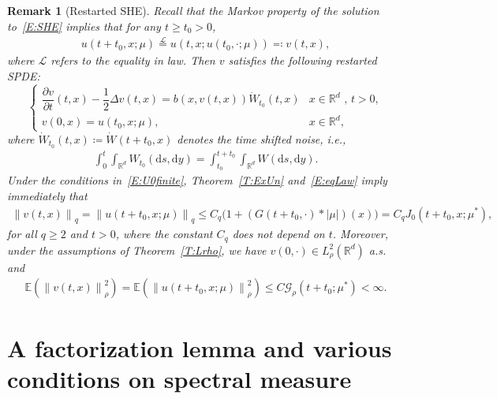 \documentclass[sn-mathphys]{sn-jnl}%
\newcommand{\BR}{\mathbb{R}}
\newcommand{\E}{\mathbb{E}}
\newcommand{\Norm}[1]{\left\| #1 \right\|}
\newcommand{\ud}{\ensuremath{\mathrm{d}}}
\numberwithin{equation}{section}
\theoremstyle{thmstyleone}%
\theoremstyle{thmstyletwo}%
\newtheorem{remark}{Remark}[section]%
\theoremstyle{thmstylethree}%
\begin{document}
\begin{remark}[Restarted SHE]\label{R:Restat}
  Recall that the Markov property of the solution to~\eqref{E:SHE} implies that for any $t\ge
  t_0>0$,
  \begin{align}\label{E:eqLaw}
    u(t + t_0,x;\mu) \stackrel{\mathcal{L}}{=}
    u\left(t,x;u\left(t_0,\cdot;\mu\right)\right) \eqqcolon v(t,x),
  \end{align}
  where $\mathcal{L}$ refers to the equality in law. Then $v$ satisfies the following restarted
  SPDE:
  \begin{equation}\label{E:restart}
    \begin{cases}
      \dfrac{\partial v}{\partial t}(t,x)-\dfrac{1}{2}\Delta v(t,x) = b(x,v(t,x))\dot W_{t_0}(t,x) & \text{$x\in \BR^d$ , $t>0$}, \\
      v(0,x) = u(t_0,x;\mu),                                                                       & x\in\BR^d,
    \end{cases}
  \end{equation}
  where $\dot{W}_{t_0}(t,x) \coloneqq \dot{W}(t + t_0,x)$ denotes the time shifted noise, i.e.,
  \begin{align}\label{E:ShiftW}
    \int_0^t \int_{\BR^d} W_{t_0}(\ud s, \ud y) = \int_{t_0}^{t+t_0} \int_{\BR^d} W(\ud s, \ud y).
  \end{align}
  Under the conditions in~\eqref{E:U0finite}, Theorem~\ref{T:ExUn} and~\eqref{E:eqLaw} imply
  immediately that
  \begin{align*}
  \Norm{v(t,x)}_q = \Norm{u(t+t_0,x;\mu)}_q
                  \le C_q\bigg(1 + (G(t+t_0, \cdot)* \lvert\mu\rvert)(x) \bigg)
                  = C_q J_0(t+t_0,x; \mu^*),
  \end{align*}
  for all $q\ge 2$ and $t>0$, where the constant $C_q$ does not depend on $t$. Moreover, under the
  assumptions of Theorem~\ref{T:Lrho}, we have $v(0,\cdot)\in L_\rho^2 (\BR^d)$ a.s. and
  \begin{align*}
        \E\left(\Norm{v(t,x)}_\rho^2\right)
    = \E\left(\Norm{u(t+t_0,x;\mu)}_\rho^2\right)
    \le C \mathcal{G}_\rho(t+t_0;\mu^*)
    < \infty.
  \end{align*}
\end{remark}

\section{A factorization lemma and various conditions on spectral measure}\label{S:Factor}
\end{document}
